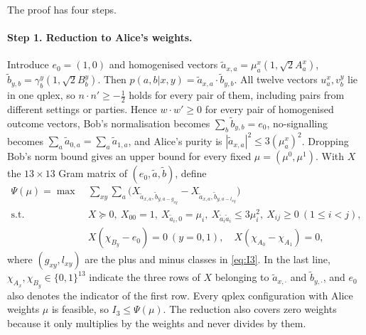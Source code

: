 \documentclass[11pt]{article}
\theoremstyle{definition}
\newcommand{\PSD}{\succeq}
\begin{document}
The proof has four steps.

\paragraph{Step 1. Reduction to Alice's weights.}
Introduce $e_0=(1,0)$ and homogenised vectors $\tilde a_{x,a}=\mu^x_a(1,\sqrt2A^x_a)$,
$\tilde b_{y,b}=\gamma^y_b(1,\sqrt2B^y_b)$. Then $p(a,b|x,y)=\tilde a_{x,a}\cdot\tilde b_{y,b}$.
All twelve vectors $u^x_a,v^y_b$ lie in one qplex, so $n\cdot n'\ge-\tfrac12$ holds for every pair of them,
including pairs from different settings or parties. Hence
$w\cdot w'\ge0$ for every pair of homogenised outcome vectors, Bob's normalisation becomes $\sum_b\tilde b_{y,b}=e_0$, no-signalling becomes
$\sum_a\tilde a_{0,a}=\sum_a\tilde a_{1,a}$, and Alice's purity is $|\tilde a_{x,a}|^2\le3(\mu^x_a)^2$.
Dropping Bob's norm bound gives an upper bound for every fixed $\mu=(\mu^0,\mu^1)$.
With $X$ the $13\times13$ Gram matrix of $(e_0,\tilde a,\tilde b)$, define
\begin{equation}\label{eq:Psi}
\begin{aligned}
\Psi(\mu)=\max\ &\textstyle\sum_{xy}\sum_a\bigl(X_{\tilde a_{x,a},\tilde b_{y,a-g_{xy}}}-X_{\tilde a_{x,a},\tilde b_{y,a-l_{xy}}}\bigr)\\
\text{s.t. }&X\PSD0,\ X_{00}=1,\ X_{\tilde a_i,0}=\mu_i,\ X_{\tilde a_i\tilde a_i}\le3\mu_i^2,\ X_{ij}\ge0\ (1\le i<j),\\
&X(\chi_{B_y}-e_0)=0\ (y=0,1),\quad X(\chi_{A_0}-\chi_{A_1})=0,
\end{aligned}
\end{equation}
where $(g_{xy},l_{xy})$ are the plus and minus classes in \eqref{eq:I3}. In the last line,
$\chi_{A_x},\chi_{B_y}\in\{0,1\}^{13}$ indicate the three rows of $X$ belonging to
$\tilde a_{x,\cdot}$ and $\tilde b_{y,\cdot}$, and $e_0$ also denotes the indicator of the first row. Every qplex configuration with Alice
weights $\mu$ is feasible, so $I_3\le\Psi(\mu)$. The reduction also covers zero weights
because it only multiplies by the weights and never divides by them.
\end{document}
